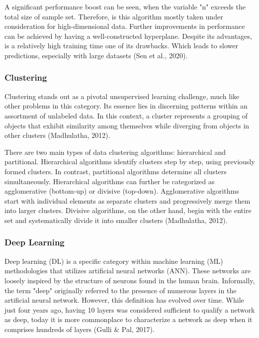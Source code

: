 \documentclass{article}
\begin{document}
\begin{multicols}{2}
A significant performance boost can be seen, when the variable "n" exceeds the total size of sample set. Therefore, is this algorithm mostly taken under consideration for high-dimensional data. Further improvements in performance can be achieved by having a well-constructed hyperplane. Despite its advantages, is a relatively high training time one of its drawbacks. Which leads to slower predictions, especially with large datasets (Sen et al., 2020).


\subsubsection{Clustering}

Clustering stands out as a pivotal unsupervised learning challenge, much like other problems in this category. Its essence lies in discerning patterns within an assortment of unlabeled data. In this context, a cluster represents a grouping of objects that exhibit similarity among themselves while diverging from objects in other clusters (Madhulatha, 2012).

There are two main types of data clustering algorithms: hierarchical and partitional. Hierarchical algorithms identify clusters step by step, using previously formed clusters. In contrast, partitional algorithms determine all clusters simultaneously. Hierarchical algorithms can further be categorized as agglomerative (bottom-up) or divisive (top-down). Agglomerative algorithms start with individual elements as separate clusters and progressively merge them into larger clusters. Divisive algorithms, on the other hand, begin with the entire set and systematically divide it into smaller clusters (Madhulatha, 2012).


\subsubsection{Deep Learning}

Deep learning (DL) is a specific category within machine learning (ML) methodologies that utilizes artificial neural networks (ANN). These networks are loosely inspired by the structure of neurons found in the human brain. Informally, the term "deep" originally referred to the presence of numerous layers in the artificial neural network. However, this definition has evolved over time. While just four years ago, having 10 layers was considered sufficient to qualify a network as deep, today it is more commonplace to characterize a network as deep when it comprises hundreds of layers (Gulli \& Pal, 2017). 


\end{multicols}
\end{document}
